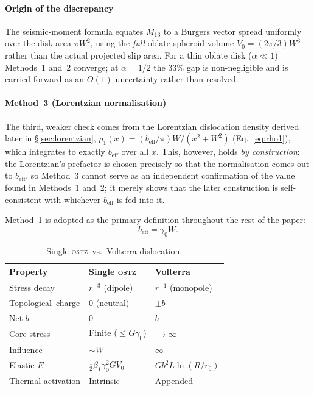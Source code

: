 \documentclass[3p]{elsarticle}
\newcommand{\OSTZ}{\textsc{ostz}}
\newcommand{\gz}{\gamma_0}
\newcommand{\beff}{b_\mathrm{eff}}
\newcommand{\half}{\tfrac{1}{2}}
\begin{document}
\paragraph{Origin of the discrepancy} The seismic-moment formula
equates $M_{13}$ to a Burgers vector spread uniformly over the disk
area $\pi W^2$, using the \emph{full} oblate-spheroid volume
$V_0=(2\pi/3)W^3$ rather than the actual projected slip area. For a
thin oblate disk ($\alpha\ll1$) Methods~1 and~2 converge; at
$\alpha=1/2$ the 33\% gap is non-negligible and is carried forward
as an $O(1)$ uncertainty rather than resolved.

\paragraph{Method~3 (Lorentzian normalisation)} The third, weaker check
comes from the Lorentzian dislocation density derived later in
\S\ref{sec:lorentzian}, $\rho_1(x)=(\beff/\pi)W/(x^2+W^2)$
(Eq.~\eqref{eq:rho1}), which integrates to exactly $\beff$ over all
$x$. This, however, holds \emph{by construction}: the Lorentzian's
prefactor is chosen precisely so that the normalisation comes out to
$\beff$, so Method~3 cannot serve as an independent confirmation of
the value found in Methods~1 and~2; it merely shows that the
later construction is self-consistent with whichever $\beff$ is fed
into it.

Method~1 is adopted as the primary definition throughout the rest of
the paper:
\begin{equation}
  \boxed{\beff=\gz W.}
  \label{eq:beff}
\end{equation}

\begin{table}[htbp]
\centering
\small
\caption{Single \OSTZ\ vs.\ Volterra dislocation.}
\label{tab:compare1}
\renewcommand{\arraystretch}{1.35}
\begin{tabular}{p{2.8cm}p{4.0cm}p{4.0cm}}
\toprule
Property & Single \OSTZ & Volterra\\
\midrule
Stress decay & $r^{-3}$ (dipole) & $r^{-1}$ (monopole)\\
Topological\ charge & 0 (neutral) & $\pm b$\\
Net $b$ & 0 & $b$\\
Core stress & Finite ($\le G\gz$) & $\to\infty$\\
Influence & $\sim W$ & $\infty$\\
Elastic $E$ & $\half\beta_1\gz^2GV_0$ & $Gb^2L\ln(R/r_0)$\\
Thermal activation & Intrinsic & Appended\\
\bottomrule
\end{tabular}
\renewcommand{\arraystretch}{1}
\end{table}
\end{document}
